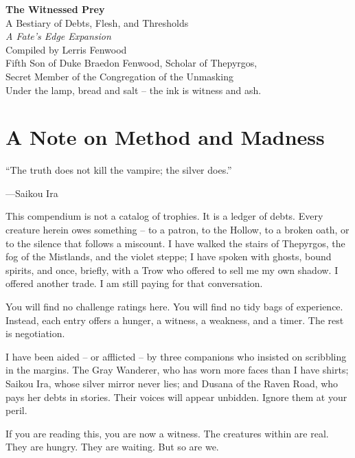 \documentclass[10pt, twoside]{book}
\begin{document}


\frontmatter
\thispagestyle{empty}
\vspace*{\fill}
\begin{center}
{\Huge\bfseries The Witnessed Prey}\\[0.5cm]
{\Large A Bestiary of Debts, Flesh, and Thresholds}\\[1cm]
\emph{A Fate's Edge Expansion}\\[2cm]
Compiled by Lerris Fenwood\\[0.3cm]
\small Fifth Son of Duke Braedon Fenwood, Scholar of Thepyrgos,\\
Secret Member of the Congregation of the Unmasking\\
\vfill
{\small Under the lamp, bread and salt -- the ink is witness and ash.}
\end{center}
\vspace*{\fill}
\clearpage

\chapter*{A Note on Method and Madness}
\epigraph{``The truth does not kill the vampire; the silver does.''}{---Saikou Ira}

This compendium is not a catalog of trophies. It is a ledger of debts. Every creature herein owes something -- to a patron, to the Hollow, to a broken oath, or to the silence that follows a miscount. I have walked the stairs of Thepyrgos, the fog of the Mistlands, and the violet steppe; I have spoken with ghosts, bound spirits, and once, briefly, with a Trow who offered to sell me my own shadow. I offered another trade. I am still paying for that conversation.

You will find no challenge ratings here. You will find no tidy bags of experience. Instead, each entry offers a hunger, a witness, a weakness, and a timer. The rest is negotiation.

I have been aided -- or afflicted -- by three companions who insisted on scribbling in the margins. The Gray Wanderer, who has worn more faces than I have shirts; Saikou Ira, whose silver mirror never lies; and Dusana of the Raven Road, who pays her debts in stories. Their voices will appear unbidden. Ignore them at your peril.

If you are reading this, you are now a witness. The creatures within are real. They are hungry. They are waiting. But so are we.
\end{document}

